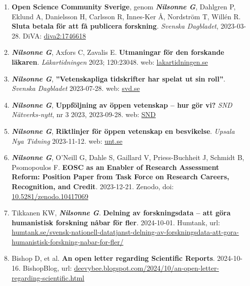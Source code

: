 \documentclass[10pt]{article}
\begin{document}
\begin{enumerate}[nolistsep]
\item \textbf{Open Science Community Sverige}, genom \textbf{\textit{Nilsonne G}}, Dahlgren P, Eklund A, Danielsson H, Carlsson R, Innes-Ker Å, Nordström T, Willén R. \textbf{Sluta betala för att få publicera forskning}. \emph{Svenska Dagbladet}, 2023-03-28. DiVA: \href{https://www.diva-portal.org/smash/record.jsf?pid=diva2\%3A1746618}{diva2:1746618}
\item \textbf{\textit{Nilsonne G}}, Axfors C, Zavalis E. \textbf{Utmaningar för den forskande läkaren}. \emph{Läkartidningen} 2023; 120:23048. web: \href{https://lakartidningen.se/klinik-och-vetenskap-1/artiklar-1/temainledning/2023/05/utmaningar-for-den-forskande-lakaren/}{lakartidningen.se} 
\item \textbf{\textit{Nilsonne G}}, \textbf{”Vetenskapliga tidskrifter har spelat ut sin roll”}. \emph{Svenska Dagbladet} 2023-07-28. web: \href{https://www.svd.se/a/Kn2da5/de-vetenskapliga-tidskrifterna-har-spelat-ut-sin-roll-skriver-gustav-nilsonne}{svd.se} 
\item \textbf{\textit{Nilsonne G}}, \textbf{Uppföljning av öppen vetenskap – hur gör vi?} \emph{SND Nätverks-nytt}, nr 3 2023, 2023-09-28. web: \href{https://www.anpdm.com/article/4340584A7644435E41724642514071/32864910/7424591}{SND} 
\item \textbf{\textit{Nilsonne G}}, \textbf{Riktlinjer för öppen vetenskap en besvikelse}. \emph{Upsala Nya Tidning} 2023-11-12. web: \href{https://unt.se/debatt/artikel/kungliga-biblioteket-missar-malet-universiteten-blir-forlorare/lw778xwr}{unt.se} 
\item \textbf{\textit{Nilsonne G}}, O'Neill G, Dahle S, Gaillard V, Priess-Buchheit J, Schmidt B, Psomopoulos F. \textbf{EOSC as an Enabler of Research Assessment Reform: Position Paper from Task Force on Research Careers, Recognition, and Credit}. 2023-12-21. Zenodo, doi: \href{https://doi.org/10.5281/zenodo.10417069}{10.5281/zenodo.10417069} 
\item Tikkanen KW, \textbf{\textit{Nilsonne G}}. \textbf{Delning av forskningsdata – att göra humanistisk forskning nåbar för fler}. 2024-10-01. Humtank, url: \href{https://humtank.se/svensk-nationell-datatjanst-delning-av-forskningsdata-att-gora-humanistisk-forskning-nabar-for-fler/}{humtank.se/svensk-nationell-datatjanst-delning-av-forskningsdata-att-gora-humanistisk-forskning-nabar-for-fler/} 
\item Bishop D, et al. \textbf{An open letter regarding Scientific Reports}. 2024-10-16. BishopBlog, url: \href{https://deevybee.blogspot.com/2024/10/an-open-letter-regarding-scientific.html}{deevybee.blogspot.com/2024/10/an-open-letter-regarding-scientific.html} 


\end{enumerate}
\end{document}
